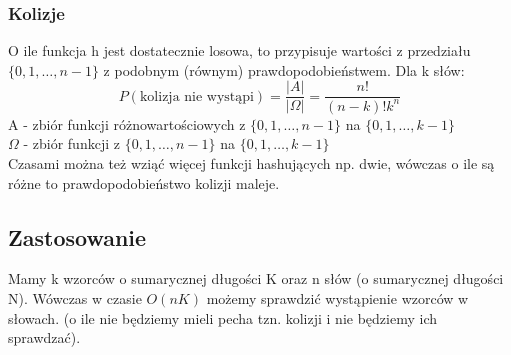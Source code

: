 \documentclass{article}
\theoremstyle{break}
\begin{document}
\subsubsection{Kolizje}
O ile funkcja h jest dostatecznie losowa, to przypisuje wartości z przedziału $\{0, 1, \dots, n-1\}$ z podobnym (równym) prawdopodobieństwem. Dla k słów:
\begin{displaymath}
P(\text{kolizja nie wystąpi}) = \frac{|A|}{|\Omega|} = \frac{n!}{(n-k)!k^n}
\end{displaymath} 
A - zbiór funkcji różnowartościowych z $\{0, 1, \dots, n-1\}$ na $\{0, 1, \dots, k-1\}$\\ 
$\Omega$ - zbiór funkcji z $\{0, 1, \dots, n-1\}$ na $\{0, 1, \dots, k-1\}$ \\
Czasami można też wziąć więcej funkcji hashujących np. dwie, wówczas o ile są różne to prawdopodobieństwo kolizji maleje.

\subsection{Zastosowanie}
Mamy k wzorców o sumarycznej długości K oraz n słów (o sumarycznej długości N). Wówczas w czasie $O(nK)$ możemy sprawdzić wystąpienie wzorców w słowach. (o ile nie będziemy mieli pecha tzn. kolizji i nie będziemy ich sprawdzać).


\begin{comment}
\subsection{*** Manacher}
Linki:
\begin{enumerate}
\item Palindromy (OI) https://main.edu.pl/pl/archive/oi/13/pal
\end{enumerate}
Wskazówki:
\begin{enumerate}

\end{enumerate}
\end{comment}
\end{document}
